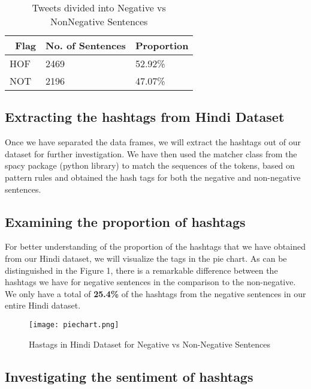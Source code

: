 \documentclass{article}
\begin{document}
\begin{table}[b]
\begin{center}
  \caption{Tweets divided into Negative vs NonNegative Sentences}
  \centering
  \begin{tabular}{p{2cm}  l p{2cm} }
    \toprule                \
    Flag     & No. of Sentences     & Proportion \\
    \midrule
    HOF     & 2469   & 52.92\% \\
    NOT     & 2196   & 47.07\%  \\
    \bottomrule
  \end{tabular}
\end{center}
\end{table}


\subsection{Extracting the hashtags from Hindi Dataset}
Once we have separated the data frames, we will extract the hashtags out of our dataset for further investigation. We have then used the matcher class from the spacy package (python library) to match the sequences of the tokens, based on pattern rules and obtained the hash tags for both the negative and non-negative sentences.

\subsection{Examining the proportion of hashtags}

For better understanding of the proportion of the hashtags that we have obtained from our Hindi dataset, we will visualize the tags in the pie chart. As can be distinguished in the Figure 1, there is a remarkable difference between the hashtags we have for negative sentences in the comparison to the non-negative. We only have a total of \textbf{25.4\%}  of the hashtags from the negative sentences in our entire Hindi dataset.

\begin{figure}
  \centering
  
  \texttt{[image: piechart.png]}
  \caption{Hastags in Hindi Dataset for Negative vs Non-Negative Sentences}
\end{figure}

\subsection{Investigating the sentiment of hashtags}
\end{document}
